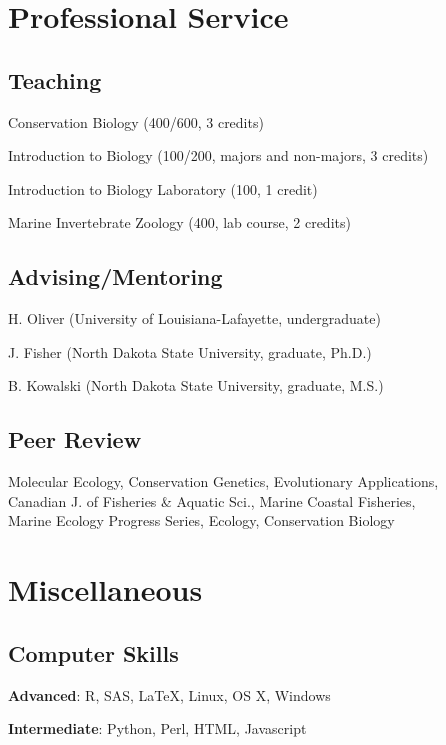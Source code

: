 \documentclass[letterpaper]{article}
\renewenvironment{itemize}{
  \begin{list}{}{
    \setlength{\leftmargin}{1em}
  }
}{
  \end{list}
}
\begin{document}
\section*{Professional Service}
  \subsection*{Teaching}
   \begin{itemize}
    \item Conservation Biology (400/600, 3 credits)
	  \item Introduction to Biology (100/200, majors and non-majors, 3 credits)
	  \item Introduction to Biology Laboratory (100, 1 credit)
	  \item Marine Invertebrate Zoology (400, lab course, 2 credits)
   \end{itemize}
  \subsection*{Advising/Mentoring}
   \begin{itemize}
    \item H. Oliver (University of Louisiana-Lafayette, undergraduate)
	  \item J. Fisher (North Dakota State University, graduate, Ph.D.)
	  \item B. Kowalski (North Dakota State University, graduate, M.S.)
   \end{itemize}
   
  \subsection*{Peer Review}
		\begin{itemize}
  		\item Molecular Ecology, Conservation Genetics, Evolutionary Applications, \\ 
      Canadian J. of Fisheries \& Aquatic Sci., Marine Coastal Fisheries, \\ 
      Marine Ecology Progress Series, Ecology, Conservation Biology
		\end{itemize}

\section*{Miscellaneous}

\subsection*{Computer Skills}
	\begin{itemize}
		\item \textbf{Advanced}: R, SAS, \LaTeX, Linux, OS X, Windows
		\item \textbf{Intermediate}: Python, Perl, HTML, Javascript
	\end{itemize}
\end{document}
